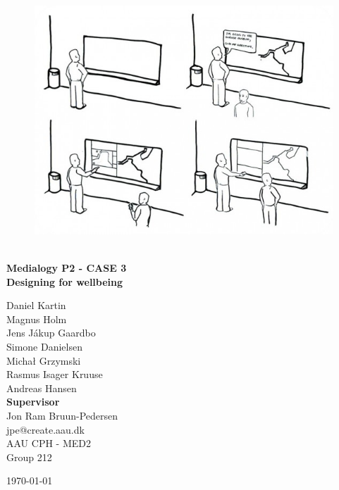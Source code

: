 \begin{titlepage}
			
\addtolength{\voffset}{2cm}

\begin{figure}[H]
\centering
\vspace{2cm}	%
\includegraphics[width=0.99\linewidth]{figure/Frontpage/frontpage_bg.jpg}
\end{figure}

\mbox{}
\vfill
\renewcommand{\familydefault}{\sfdefault} \normalfont %
\HRule\\[0.2cm]
\textbf{{\small Medialogy P2 - CASE 3 \\ \Huge Designing for wellbeing}}\\
\HRule\medskip{}
\begin{multicols}{2}
{\Large Daniel Kartin\vspace{0.3mm}\\Magnus Holm\\Jens Jákup Gaardbo\\Simone Danielsen\\Michał Grzymski\\Rasmus Isager Kruuse\\Andreas Hansen\columnbreak}\\
\setlength{\parskip}{2.4cm}
\Large{\textbf{Supervisor}\\Jon Ram Bruun-Pedersen\\jpe@create.aau.dk}
\\\small AAU CPH - 
MED2 \\
Group 212\\
\end{multicols}
\today
\renewcommand{\familydefault}{\rmdefault} \normalfont %
\end{titlepage}


